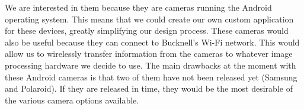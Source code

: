 \documentclass{article}
\begin{document}
We are interested in them because they are cameras running the Android operating system. This means that we could create our own custom application for these devices, greatly simplifying our design process. These cameras would also be useful because they can connect to Bucknell's Wi-Fi network. This would allow us to wirelessly transfer information from the cameras to whatever image processing hardware we decide to use. The main drawbacks at the moment with these Android cameras is that two of them have not been released yet (Samsung and Polaroid). If they are released in time, they would be the most desirable of the various camera options available.





\end{document}
